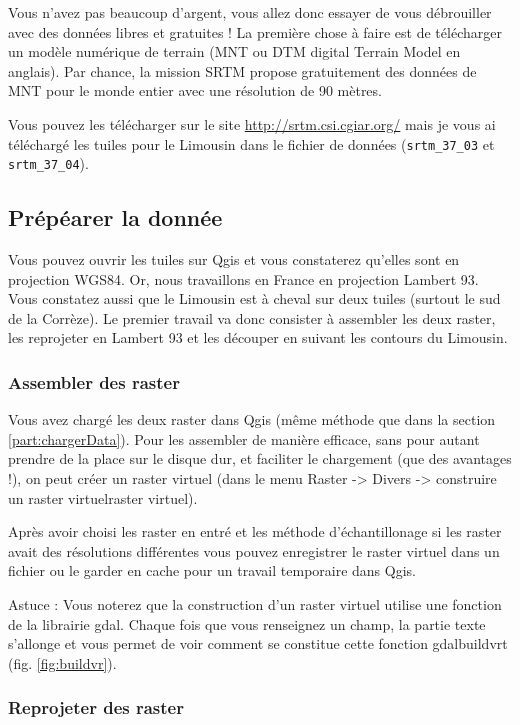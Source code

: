 \documentclass[a4paper, 11pt]{article}
\begin{document}
  Vous n'avez pas beaucoup d'argent, vous allez donc essayer de vous débrouiller avec des données libres et gratuites ! La première chose à faire est de télécharger un modèle numérique de terrain (MNT ou DTM digital Terrain Model en anglais). Par chance, la mission SRTM propose gratuitement des données de MNT pour le monde entier avec une résolution de 90 mètres.

  Vous pouvez les télécharger sur le site \url{http://srtm.csi.cgiar.org/} mais je vous ai téléchargé les tuiles pour le Limousin dans le fichier de données (\texttt{srtm\_37\_03} et \texttt{srtm\_37\_04}).

  \subsection{Prépéarer la donnée}

  Vous pouvez ouvrir les tuiles sur Qgis et vous constaterez qu'elles sont en projection WGS84. Or, nous travaillons en France en projection Lambert 93. Vous constatez aussi que le Limousin est à cheval sur deux tuiles (surtout le sud de la Corrèze). Le premier travail va donc consister à assembler les deux raster, les reprojeter en Lambert 93 et les découper en suivant les contours du Limousin.

    \subsubsection{Assembler des raster}

    Vous avez chargé les deux raster dans Qgis (même méthode que dans la section \ref{part:chargerData}). Pour les assembler de manière efficace, sans pour autant prendre de la place sur le disque dur, et faciliter le chargement (que des avantages !), on peut créer un raster virtuel (dans le menu Raster -> Divers -> construire un raster virtuelraster virtuel).

    Après avoir choisi les raster en entré et les méthode d'échantillonage si les raster avait des résolutions différentes vous pouvez enregistrer le raster virtuel dans un fichier ou le garder en cache pour un travail temporaire dans Qgis.

    Astuce : Vous noterez que la construction d'un raster virtuel utilise une fonction de la librairie gdal. Chaque fois que vous renseignez un champ, la partie texte s'allonge et vous permet de voir comment se constitue cette fonction gdalbuildvrt (fig. \ref{fig:buildvr}).

    \subsubsection{Reprojeter des raster}
\end{document}
